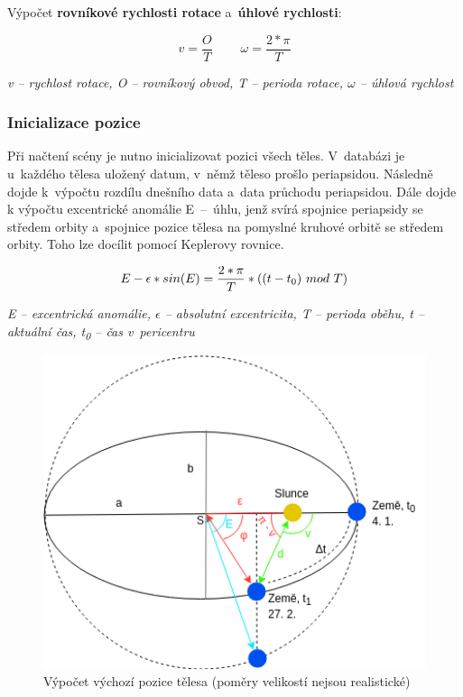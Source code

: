 \documentclass[a4paper,12pt]{article}
\begin{document}
Výpočet \textbf{rovníkové rychlosti rotace} a~\textbf{úhlové rychlosti}:

\vspace*{-0.5cm}
$$v = \frac{O}{T}~~~~~~~~~~\omega = \frac{2 * \pi}{T}$$
\begin{center}
\textit{v -- rychlost rotace, O -- rovníkový obvod, T -- perioda rotace, $\omega$ -- úhlová rychlost}
\end{center}


\subsubsection{Inicializace pozice}

Při načtení scény je nutno inicializovat pozici všech těles. V~databázi je u~každého tělesa uložený datum, v~němž těleso prošlo periapsidou. Následně dojde k~výpočtu rozdílu dnešního data a~data průchodu periapsidou. Dále dojde k výpočtu excentrické anomálie E~--~úhlu, jenž svírá spojnice periapsidy se středem orbity a~spojnice pozice tělesa na pomyslné kruhové orbitě se středem orbity. Toho lze docílit pomocí Keplerovy rovnice.~\cite{kleczek}

\vspace*{-0.5cm}
$$E -  \epsilon * sin(E) = \frac{2 * \pi}{T} * ((t - t\textsubscript{0})~mod~T)$$
\begin{center}
\textit{E -- excentrická anomálie, $\epsilon$ -- absolutní excentricita, T -- perioda oběhu, t -- aktuální čas, t\textsubscript{0} -- čas v~pericentru}~\cite{kleczek}
\end{center}

\begin{figure}[H]
\begin{center}
\includegraphics[width=350pt]{Images/Initial.png}
\caption[Výpočet výchozí pozice tělesa]{Výpočet výchozí pozice tělesa (poměry velikostí nejsou realistické) \footnotemark[1]}
\end{center}
\end{figure}
\end{document}
